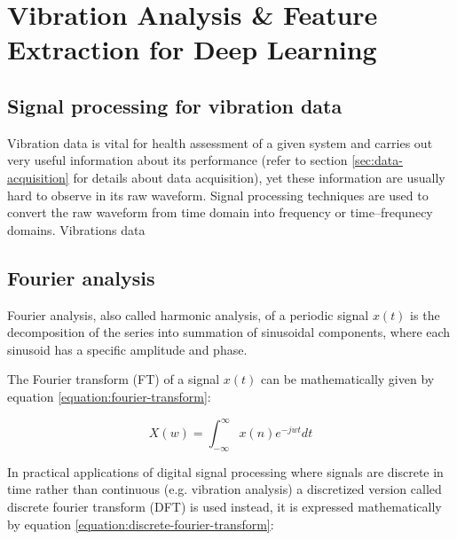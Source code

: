 \chapter{Vibration Analysis \& Feature Extraction for Deep Learning}


  \section{Signal processing for vibration data}
Vibration data is vital for health assessment of a given system and carries out very useful information about its performance (refer to section \ref{sec:data-acquisition} for details about data acquisition), yet these information are usually hard to observe in its raw waveform. Signal processing techniques are used to convert the raw waveform from time domain into frequency or time–frequnecy domains.
Vibrations data 

\section{Fourier analysis}
Fourier analysis, also called harmonic analysis, of a periodic signal $x(t)$ is the decomposition of the series into summation of sinusoidal components, where each sinusoid has a specific amplitude and phase.

The Fourier transform (FT) of a signal $x(t)$ can be mathematically given by equation \ref{equation:fourier-transform}:

\begin{equation}
    X(w) = \int_{-\infty}^{\infty}x(n)e^{-jwt}dt
    \label{equation:fourier-transform}
\end{equation}

In practical applications of digital signal processing where signals are discrete in time rather than continuous (e.g. vibration analysis) a discretized version called discrete fourier transform (DFT) is used instead, it is expressed mathematically by equation \ref{equation:discrete-fourier-transform}:

